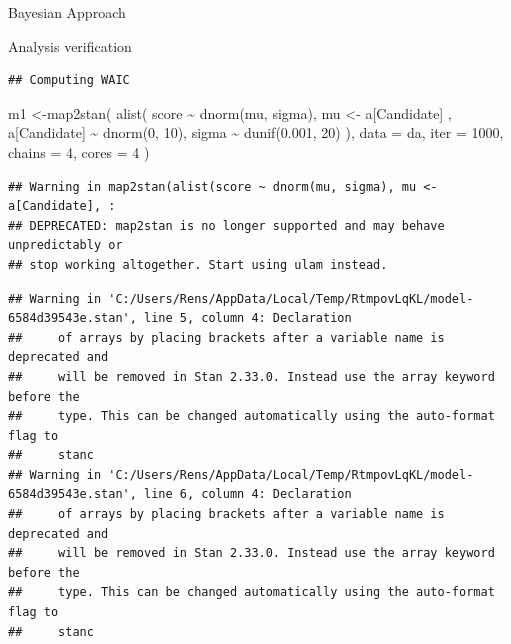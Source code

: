 \documentclass[
  ignorenonframetext,
]{beamer}
\newenvironment{Shaded}{\begin{snugshade}}{\end{snugshade}}
\newcommand{\AttributeTok}[1]{\textcolor[rgb]{0.77,0.63,0.00}{#1}}
\newcommand{\DecValTok}[1]{\textcolor[rgb]{0.00,0.00,0.81}{#1}}
\newcommand{\FloatTok}[1]{\textcolor[rgb]{0.00,0.00,0.81}{#1}}
\newcommand{\FunctionTok}[1]{\textcolor[rgb]{0.00,0.00,0.00}{#1}}
\newcommand{\NormalTok}[1]{#1}
\newcommand{\OtherTok}[1]{\textcolor[rgb]{0.56,0.35,0.01}{#1}}
\newcommand{\SpecialCharTok}[1]{\textcolor[rgb]{0.00,0.00,0.00}{#1}}
\begin{document}
\begin{frame}[fragile]{Bayesian Approach}
\begin{block}{Analysis verification}
\begin{verbatim}
## Computing WAIC
\end{verbatim}

\begin{Shaded}
\begin{Highlighting}[]
\NormalTok{m1 }\OtherTok{\textless{}{-}}\FunctionTok{map2stan}\NormalTok{(}
  \FunctionTok{alist}\NormalTok{(}
\NormalTok{    score }\SpecialCharTok{\textasciitilde{}} \FunctionTok{dnorm}\NormalTok{(mu, sigma),}
\NormalTok{    mu }\OtherTok{\textless{}{-}}\NormalTok{ a[Candidate] ,}
\NormalTok{    a[Candidate] }\SpecialCharTok{\textasciitilde{}} \FunctionTok{dnorm}\NormalTok{(}\DecValTok{0}\NormalTok{, }\DecValTok{10}\NormalTok{),}
\NormalTok{    sigma }\SpecialCharTok{\textasciitilde{}} \FunctionTok{dunif}\NormalTok{(}\FloatTok{0.001}\NormalTok{, }\DecValTok{20}\NormalTok{)}
\NormalTok{  ), }\AttributeTok{data =}\NormalTok{ da, }\AttributeTok{iter =} \DecValTok{1000}\NormalTok{, }\AttributeTok{chains =} \DecValTok{4}\NormalTok{, }\AttributeTok{cores =} \DecValTok{4}
\NormalTok{)}
\end{Highlighting}
\end{Shaded}

\begin{verbatim}
## Warning in map2stan(alist(score ~ dnorm(mu, sigma), mu <- a[Candidate], :
## DEPRECATED: map2stan is no longer supported and may behave unpredictably or
## stop working altogether. Start using ulam instead.
\end{verbatim}

\begin{verbatim}
## Warning in 'C:/Users/Rens/AppData/Local/Temp/RtmpovLqKL/model-6584d39543e.stan', line 5, column 4: Declaration
##     of arrays by placing brackets after a variable name is deprecated and
##     will be removed in Stan 2.33.0. Instead use the array keyword before the
##     type. This can be changed automatically using the auto-format flag to
##     stanc
## Warning in 'C:/Users/Rens/AppData/Local/Temp/RtmpovLqKL/model-6584d39543e.stan', line 6, column 4: Declaration
##     of arrays by placing brackets after a variable name is deprecated and
##     will be removed in Stan 2.33.0. Instead use the array keyword before the
##     type. This can be changed automatically using the auto-format flag to
##     stanc
\end{verbatim}


\end{block}
\end{frame}
\end{document}
